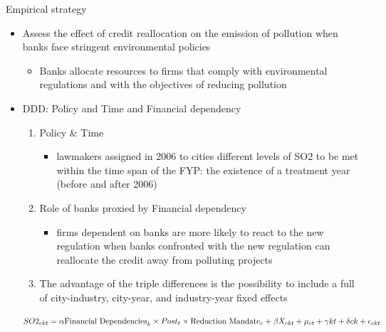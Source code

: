 \documentclass{beamer}
\begin{document}
\begin{framefont}{\small}{\scriptsize}{\scriptsize}
    \begin{frame}{Empirical strategy}
        \begin{itemize}
            \item Assess the effect of credit reallocation on the emission of pollution when banks face stringent environmental policies
            \begin{itemize}
                \item Banks allocate resources to firms that comply with environmental regulations and with the objectives of reducing pollution
            \end{itemize}
            \item DDD: Policy and Time and Financial dependency
            \begin{enumerate}
                \item  Policy & Time
                \begin{itemize}
                    \item lawmakers assigned in 2006 to cities different levels of SO2 to be met within the time span of the FYP: the existence of a treatment year (before and after 2006)
                \end{itemize}
                \item  Role of banks proxied by Financial dependency
                \begin{itemize}
                    \item firms dependent on banks are more likely to react to the new regulation when banks confronted with the new regulation can reallocate the credit away from polluting projects
                \end{itemize}
                \item The advantage of the triple differences is the possibility to include a full of city-industry, city-year, and industry-year fixed effects
            \end{enumerate}
            \begin{equation*}
                SO2_{ckt} = \alpha\text{Financial Dependencies}_{k} \times Post_{t} \times \text{Reduction Mandate}_{c} + \\
                \beta X_{ckt} + \mu_{ct} + \gamma{kt} + \delta{ck} + \epsilon_{ckt}
            \end{equation*}
        \end{itemize}
    \end{frame}
\end{framefont}
\end{document}
